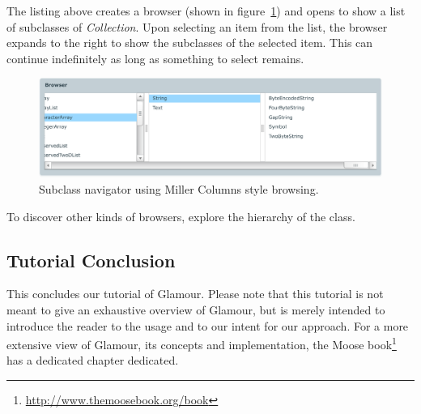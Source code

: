 \documentclass[a4paper,10pt,twoside]{book}
\begin{document}
The listing above creates a browser (shown in figure~\ref{fig:finder})
and opens to show a list of subclasses of \emph{Collection}. Upon
selecting an item from the list, the browser expands to the right to
show the subclasses of the selected item. This can continue
indefinitely as long as something to select remains.

\begin{figure}[htbp]
\centerline{\includegraphics[width=\linewidth]{finder.pdf}}
\caption{Subclass navigator using Miller Columns style browsing.}
\label{fig:finder}
\end{figure}

To discover other kinds of browsers, explore the hierarchy of the
 class.

\subsection{Tutorial Conclusion}

This concludes our tutorial of Glamour. Please note that this tutorial
is not meant to give an exhaustive overview of Glamour, but is merely
intended to introduce the reader to the usage and to our intent for
our approach. For a more extensive view of Glamour, its concepts and
implementation, the Moose
book\footnote{\url{http://www.themoosebook.org/book}} has a dedicated
chapter dedicated.

\ifx\wholebook\relax\else
   
   
\end{document}
